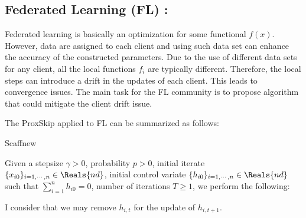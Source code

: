 \begin{itemize}
\subsection{Federated Learning (FL) : } 

Federated learning is basically an optimization for some functional $f(x)$. However, data are assigned to each client and using such data set can enhance the accuracy of the constructed parameters. Due to the use of different data sets for any client, all the local functions $f_i$ are typically different. Therefore, the local steps can introduce a drift in the updates of each client. This leads to convergence issues. The main task for the FL community is to propose algorithm that could mitigate the client drift issue. 
 
The ProxSkip applied to FL can be summarized as follows: 
\begin{algorithm}
\caption{Scaffnew}\label{alg:mainscaff}
Given a stepsize $\gamma > 0$, probability $p > 0$, initial iterate $\{x_{i0}\}_{i=1,\cdots,n} \in \Reals{nd}$, initial control variate $\{h_{i0}\}_{i=1,\cdots,n} \in \Reals{nd}$ such that $\sum_{i=1}^n h_{i0} = 0$, number of iterations $T \geq 1$, we perform the following:  
\begin{algorithmic}




\Else
    
\EndIf 

\EndFor
\end{algorithmic}
\end{algorithm}
\begin{remark}
I consider that we may remove $h_{i,t}$ for the update of $h_{i,t+1}$. 
\end{remark}


\end{itemize}
